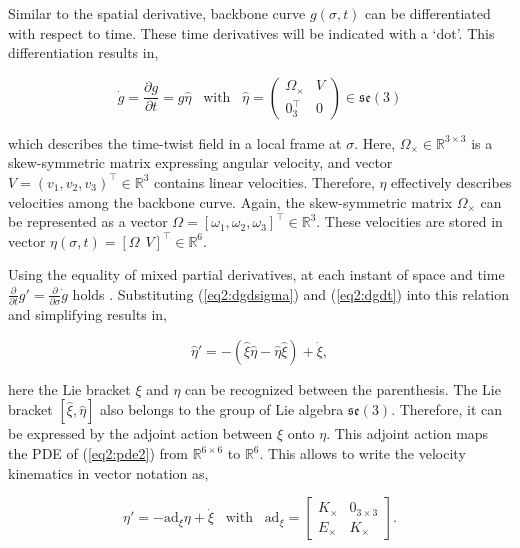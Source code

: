 Similar to the spatial derivative, backbone curve $g(\sigma,t)$ can be differentiated with respect to time. These time derivatives will be indicated with a `dot'. This differentiation results in, 

\begin{equation}
  \Dot{g} = \frac{\partial g}{\partial t} = g \hat{\eta} \hspace{10pt} \text{with} \hspace{10pt}  \hat{\eta} = \begin{pmatrix} \Omega_\times & V \\ 0_3^\top & 0 \end{pmatrix} \in  \mathfrak{se}(3)
    \label{eq2:dgdt}
\end{equation}

which describes the time-twist field in a local frame at $\sigma$. Here, $\Omega_\times \in \mathbb{R}^{3 \times 3}$ is a skew-symmetric matrix expressing angular velocity, and vector $V = (v_1,v_2,v_3)^\top \in \mathbb{R}^3$ contains linear velocities. Therefore, $\eta$ effectively describes velocities among the backbone curve. Again, the skew-symmetric matrix $\Omega_\times$ can be represented as a vector $\Omega = [\omega_1,\omega_2,\omega_3]^\top \in \mathbb{R}^3$. These velocities are stored in vector $\eta(\sigma,t) = [\Omega \hspace{5pt} V]^\top \in \mathbb{R}^6$.

Using the equality of mixed partial derivatives, at each instant of space and time $\frac{\partial}{\partial t}g' = \frac{\partial}{\partial \sigma}\dot{g}$ holds \cite{Caasenbrood2020}. Substituting (\ref{eq2:dgdsigma}) and (\ref{eq2:dgdt}) into this relation and simplifying results in,

\begin{equation}
    \hat{\eta}' = -(\hat{\xi}\hat{\eta} - \hat{\eta}\hat{\xi}) + \Dot{\xi},
        \label{eq2:pde2}
\end{equation}

here the Lie bracket $\xi$ and $\eta$ can be recognized between the parenthesis. The Lie bracket $[\hat{\xi},\hat{\eta}]$ also belongs to the group of Lie algebra $\mathfrak{se}(3)$. Therefore, it can be expressed by the adjoint action between $\xi$ onto $\eta$. This adjoint action maps the PDE of (\ref{eq2:pde2}) from $\mathbb{R}^{6\times 6}$ to $\mathbb{R}^6$. This allows to write the velocity kinematics in vector notation as,

\begin{equation}
    \eta'= -\text{ad}_\xi \eta + \Dot{\xi} \hspace{10pt} \text{with} \hspace{10pt} \text{ad}_{\xi} = \begin{bmatrix} K_\times & 0_{3\times 3} \\ E_\times & K_\times \end{bmatrix}.
    \label{eq2:etapde}
\end{equation}


